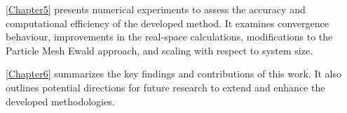 \autoref{Chapter5} presents numerical experiments to assess the accuracy and computational efficiency of the developed method. It examines convergence behaviour, improvements in the real-space calculations, modifications to the Particle Mesh Ewald approach, and scaling with respect to system size.

\autoref{Chapter6} summarizes the key findings and contributions of this work. It also outlines potential directions for future research to extend and enhance the developed methodologies.